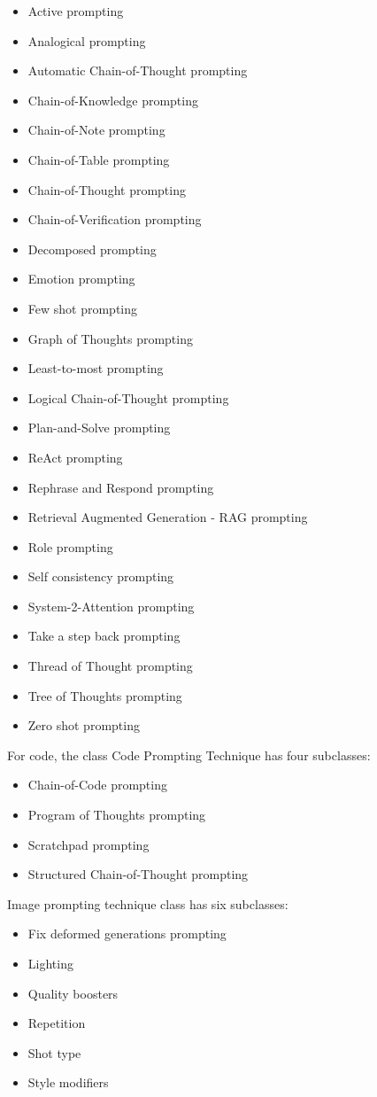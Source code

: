 \begin{itemize}
    \item Active prompting
    \item Analogical prompting
    \item Automatic Chain-of-Thought prompting
    \item Chain-of-Knowledge prompting
    \item Chain-of-Note prompting
    \item Chain-of-Table prompting
    \item Chain-of-Thought prompting
    \item Chain-of-Verification prompting
    \item Decomposed prompting
    \item Emotion prompting
    \item Few shot prompting
    \item Graph of Thoughts prompting
    \item Least-to-most prompting
    \item Logical Chain-of-Thought prompting
    \item Plan-and-Solve prompting
    \item ReAct prompting
    \item Rephrase and Respond prompting
    \item Retrieval Augmented Generation - RAG prompting
    \item Role prompting
    \item Self consistency prompting
    \item System-2-Attention prompting
    \item Take a step back prompting
    \item Thread of Thought prompting
    \item Tree of Thoughts prompting
    \item Zero shot prompting
\end{itemize}
For code, the class Code Prompting Technique has four subclasses:
\begin{itemize}
    \item Chain-of-Code prompting
    \item Program of Thoughts prompting
    \item Scratchpad prompting
    \item Structured Chain-of-Thought prompting
\end{itemize}
Image prompting technique class has six subclasses:
\begin{itemize}
    \item Fix deformed generations prompting
    \item Lighting
    \item Quality boosters
    \item Repetition
    \item Shot type
    \item Style modifiers
\end{itemize}
